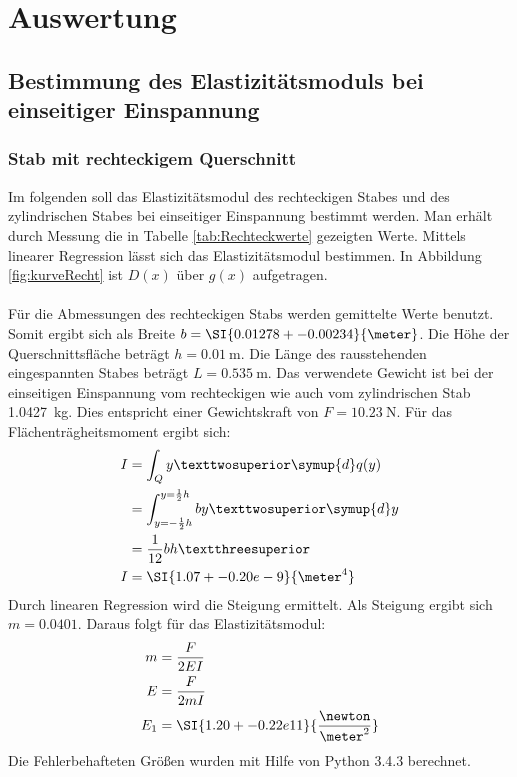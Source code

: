 \section{Auswertung}
\label{sec:Auswertung}
\subsection{Bestimmung des Elastizitätsmoduls bei einseitiger Einspannung}
\subsubsection{Stab mit rechteckigem Querschnitt}
\label{sec:rechteck}
Im folgenden soll das Elastizitätsmodul des rechteckigen Stabes und des zylindrischen Stabes bei einseitiger Einspannung bestimmt werden.
Man erhält durch Messung die in Tabelle \ref{tab:Rechteckwerte} gezeigten Werte. Mittels linearer Regression lässt sich das Elastizitätsmodul bestimmen.
In Abbildung \ref{fig:kurveRecht} ist $D(x)$ über $g(x)$ aufgetragen.
\\
\\
Für die Abmessungen des rechteckigen Stabs werden gemittelte Werte benutzt. Somit ergibt sich als Breite $b=\SI{0.01278+-0.00234}{\meter}$.
Die Höhe der Querschnittsfläche beträgt $h=\SI{0.01}{\meter}$. Die Länge des rausstehenden eingespannten Stabes beträgt $L=\SI{0.535}{\meter}$.
Das verwendete Gewicht ist bei der einseitigen Einspannung vom rechteckigen wie auch vom zylindrischen Stab \SI{1.0427}{\kilo\gram}. Dies entspricht einer
Gewichtskraft von $F=\SI{10.23}{\newton}$. Für das Flächenträgheitsmoment ergibt sich:
\begin{align*}
  I &= \int_Q y² \symup{d}q(y) \\
    &= \int_{y=-\frac{1}{2}h}^{y=\frac{1}{2}h} by² \symup{d}y \\
    &= \frac{1}{12}bh³ \\
  I &= \SI{1.07+-0.20e-9}{\meter^4}\\
\end{align*}
Durch linearen Regression wird die Steigung ermittelt. Als Steigung ergibt sich $m=\num{0.0401}$. Daraus folgt für das Elastizitätsmodul:
\begin{align*}
  m   &= \frac{F}{2EI} \\
  E   &= \frac{F}{2mI} \\
  E_1 &= \SI{1.20+-0.22e11}{\frac{\newton}{\meter^2}} \\
\end{align*}
Die Fehlerbehafteten Größen wurden mit Hilfe von Python 3.4.3 berechnet.

